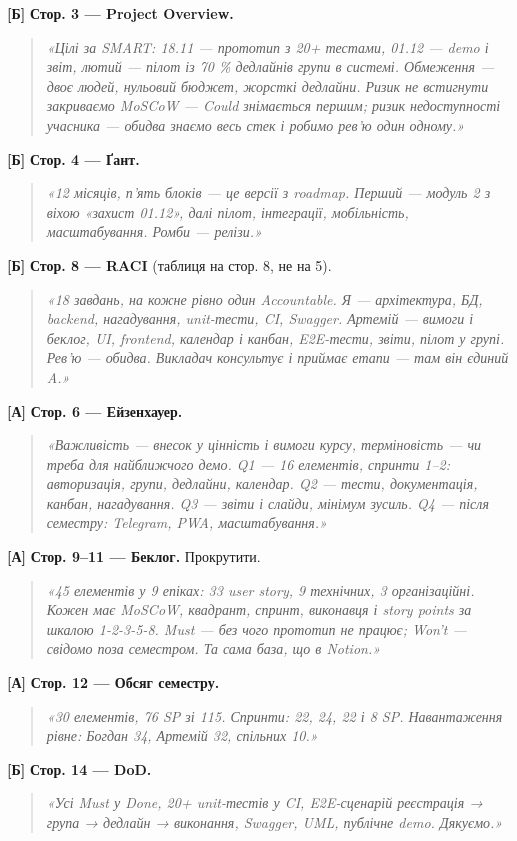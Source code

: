 \documentclass[11pt]{article}
\newcommand{\say}[1]{\begin{quote}\itshape «#1»\end{quote}}
\newcommand{\who}[1]{\textcolor{accent}{\textbf{[#1]}}}
\begin{document}
\who{Б} \textbf{Стор. 3 — Project Overview.}
\say{Цілі за SMART: 18.11 — прототип з 20+ тестами, 01.12 — demo і звіт, лютий — пілот із 70 \% дедлайнів групи в системі. Обмеження — двоє людей, нульовий бюджет, жорсткі дедлайни. Ризик не встигнути закриваємо MoSCoW — Could знімається першим; ризик недоступності учасника — обидва знаємо весь стек і робимо рев'ю один одному.}

\who{Б} \textbf{Стор. 4 — Ґант.}
\say{12 місяців, п'ять блоків — це версії з roadmap. Перший — модуль 2 з віхою «захист 01.12», далі пілот, інтеграції, мобільність, масштабування. Ромби — релізи.}

\who{Б} \textbf{Стор. 8 — RACI} (таблиця на стор. 8, не на 5).
\say{18 завдань, на кожне рівно один Accountable. Я — архітектура, БД, backend, нагадування, unit-тести, CI, Swagger. Артемій — вимоги і беклог, UI, frontend, календар і канбан, E2E-тести, звіти, пілот у групі. Рев'ю — обидва. Викладач консультує і приймає етапи — там він єдиний A.}

\who{А} \textbf{Стор. 6 — Ейзенхауер.}
\say{Важливість — внесок у цінність і вимоги курсу, терміновість — чи треба для найближчого демо. Q1 — 16 елементів, спринти 1–2: авторизація, групи, дедлайни, календар. Q2 — тести, документація, канбан, нагадування. Q3 — звіти і слайди, мінімум зусиль. Q4 — після семестру: Telegram, PWA, масштабування.}

\who{А} \textbf{Стор. 9–11 — Беклог.} Прокрутити.
\say{45 елементів у 9 епіках: 33 user story, 9 технічних, 3 організаційні. Кожен має MoSCoW, квадрант, спринт, виконавця і story points за шкалою 1-2-3-5-8. Must — без чого прототип не працює; Won't — свідомо поза семестром. Та сама база, що в Notion.}

\who{А} \textbf{Стор. 12 — Обсяг семестру.}
\say{30 елементів, 76 SP зі 115. Спринти: 22, 24, 22 і 8 SP. Навантаження рівне: Богдан 34, Артемій 32, спільних 10.}

\who{Б} \textbf{Стор. 14 — DoD.}
\say{Усі Must у Done, 20+ unit-тестів у CI, E2E-сценарій реєстрація → група → дедлайн → виконання, Swagger, UML, публічне demo. Дякуємо.}
\end{document}
